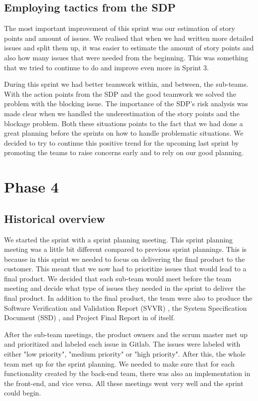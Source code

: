 \documentclass{article}
\begin{document}
\subsection{Employing tactics from the SDP}
The most important improvement of this sprint was our estimation of story points and amount of issues. We realised that when we had written more detailed issues and split them up, it was easier to estimate the amount of story points and also how many issues that were needed from the beginning. This was something that we tried to continue to do and improve even more in Sprint 3. 

During this sprint we had better teamwork within, and between, the sub-teams. With the action points from the SDP and the good teamwork we solved the problem with the blocking issue. The importance of the SDP's risk analysis was made clear when we handled the underestimation of the story points and the blockage problem. Both these situations points to the fact that we had done a great planning before the sprints on how to handle problematic situations. We decided to try to continue this positive trend for the upcoming last sprint by promoting the teams to raise concerns early and to rely on our good planning.

\section{Phase 4} %
\subsection{Historical overview}
We started the sprint with a sprint planning meeting. This sprint planning meeting was a little bit different compared to previous sprint plannings. This is because in this sprint we needed to focus on delivering the final product to the customer. This meant that we now had to prioritize issues that would lead to a final product. We decided that each sub-team would meet before the team meeting and decide what type of issues they needed in the sprint to deliver the final product. In addition to the final product, the team were also to produce the Software Verification and Validation Report (SVVR) \cite{SVVR}, the System Specification Document (SSD) \cite{SSD}, and Project Final Report in of itself.

After the sub-team meetings, the product owners and the scrum master met up and prioritized and labeled each issue in Gitlab. The issues were labeled with either "low priority", "medium priority" or "high priority". After this, the whole team met up for the sprint planning. We needed to make sure that for each functionality created by the back-end team, there was also an implementation in the front-end, and vice versa. All these meetings went very well and the sprint could begin.
\end{document}

